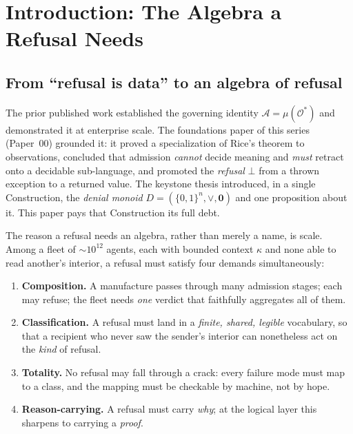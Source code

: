 \documentclass[11pt,oneside]{book}
\theoremstyle{definition}
\theoremstyle{plain}
\theoremstyle{remark}
\newcommand{\Adm}{\mathcal{O}^{*}}             %
\newcommand{\Act}{\mathcal{A}}                 %
\newcommand{\muop}{\mu}                        %
\newcommand{\Rfsl}{\bot}                        %
\newcommand{\CL}{\kappa}                       %
\begin{document}
\tableofcontents

\mainmatter

\chapter{Introduction: The Algebra a Refusal Needs}
\label{ch:intro}

\section{From ``refusal is data'' to an algebra of refusal}

The prior published work \cite{chatman2025} established the governing identity
$\Act=\muop(\Adm)$ and demonstrated it at enterprise scale. The foundations paper of this
series (Paper~00) grounded it: it proved a specialization of Rice's theorem
\cite{rice1953} to observations, concluded that admission \emph{cannot} decide meaning and
\emph{must} retract onto a decidable sub-language, and promoted the \emph{refusal} $\Rfsl$
from a thrown exception to a returned value. The keystone thesis introduced, in a single
Construction, the \emph{denial monoid} $D=(\{0,1\}^{n},\lor,\bm 0)$ and one proposition
about it. This paper pays that Construction its full debt.

The reason a refusal needs an algebra, rather than merely a name, is scale. Among a fleet
of $\sim\!10^{12}$ agents, each with bounded context $\CL$ and none able to read another's
interior, a refusal must satisfy four demands simultaneously:

\begin{enumerate}[label=(D\arabic*),leftmargin=*]
\item \textbf{Composition.} A manufacture passes through many admission stages; each may
refuse; the fleet needs \emph{one} verdict that faithfully aggregates all of them.
\item \textbf{Classification.} A refusal must land in a \emph{finite, shared, legible}
vocabulary, so that a recipient who never saw the sender's interior can nonetheless act on
the \emph{kind} of refusal.
\item \textbf{Totality.} No refusal may fall through a crack: every failure mode must map to
a class, and the mapping must be checkable by machine, not by hope.
\item \textbf{Reason-carrying.} A refusal must carry \emph{why}; at the logical layer this
sharpens to carrying a \emph{proof}.
\end{enumerate}
\end{document}
